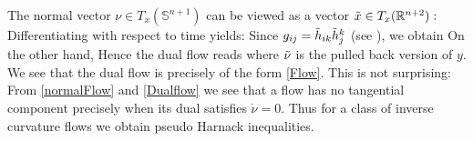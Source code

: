 The normal vector $\nu\in T_x(\mathbb{S}^{n+1})$ can be viewed as a vector $\tilde{x}\in T_x(\R^{n+2}):$
Differentiating with respect to time yields:
Since $g_{ij}=\~h_{ik}\~h^k_j$ (see \cite[Thm.~9.2.5]{Gerhardt:/2006}), we obtain
On the other hand,
 Hence the dual flow reads
 where $\~\nu$ is the pulled back version of $y$. We see that the dual flow is precisely of the form \eqref{Flow}. This is not surprising: From \eqref{normalFlow} and \eqref{Dualflow} we see that a flow has no tangential component precisely when its dual satisfies $\dot{\nu}=0.$
Thus for a class of inverse curvature flows we obtain pseudo Harnack inequalities.

